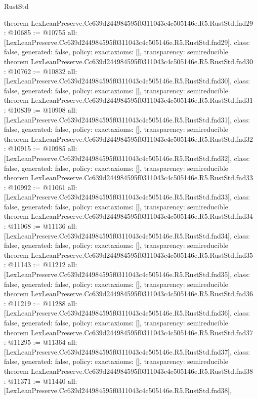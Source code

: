 \begin{lexlean}{RustStd}
\begin{coremodule}
{}
theorem LexLeanPreserve.Cc639d244984595f0311043c4c505146e.R5.RustStd.fnd29 : @10685 := @10755 {
  all: [LexLeanPreserve.Cc639d244984595f0311043c4c505146e.R5.RustStd.fnd29],
  class: false,
  generated: false,
  policy: exact{axioms: []},
  transparency: semireducible
}
theorem LexLeanPreserve.Cc639d244984595f0311043c4c505146e.R5.RustStd.fnd30 : @10762 := @10832 {
  all: [LexLeanPreserve.Cc639d244984595f0311043c4c505146e.R5.RustStd.fnd30],
  class: false,
  generated: false,
  policy: exact{axioms: []},
  transparency: semireducible
}
theorem LexLeanPreserve.Cc639d244984595f0311043c4c505146e.R5.RustStd.fnd31 : @10839 := @10908 {
  all: [LexLeanPreserve.Cc639d244984595f0311043c4c505146e.R5.RustStd.fnd31],
  class: false,
  generated: false,
  policy: exact{axioms: []},
  transparency: semireducible
}
theorem LexLeanPreserve.Cc639d244984595f0311043c4c505146e.R5.RustStd.fnd32 : @10915 := @10985 {
  all: [LexLeanPreserve.Cc639d244984595f0311043c4c505146e.R5.RustStd.fnd32],
  class: false,
  generated: false,
  policy: exact{axioms: []},
  transparency: semireducible
}
theorem LexLeanPreserve.Cc639d244984595f0311043c4c505146e.R5.RustStd.fnd33 : @10992 := @11061 {
  all: [LexLeanPreserve.Cc639d244984595f0311043c4c505146e.R5.RustStd.fnd33],
  class: false,
  generated: false,
  policy: exact{axioms: []},
  transparency: semireducible
}
theorem LexLeanPreserve.Cc639d244984595f0311043c4c505146e.R5.RustStd.fnd34 : @11068 := @11136 {
  all: [LexLeanPreserve.Cc639d244984595f0311043c4c505146e.R5.RustStd.fnd34],
  class: false,
  generated: false,
  policy: exact{axioms: []},
  transparency: semireducible
}
theorem LexLeanPreserve.Cc639d244984595f0311043c4c505146e.R5.RustStd.fnd35 : @11143 := @11212 {
  all: [LexLeanPreserve.Cc639d244984595f0311043c4c505146e.R5.RustStd.fnd35],
  class: false,
  generated: false,
  policy: exact{axioms: []},
  transparency: semireducible
}
theorem LexLeanPreserve.Cc639d244984595f0311043c4c505146e.R5.RustStd.fnd36 : @11219 := @11288 {
  all: [LexLeanPreserve.Cc639d244984595f0311043c4c505146e.R5.RustStd.fnd36],
  class: false,
  generated: false,
  policy: exact{axioms: []},
  transparency: semireducible
}
theorem LexLeanPreserve.Cc639d244984595f0311043c4c505146e.R5.RustStd.fnd37 : @11295 := @11364 {
  all: [LexLeanPreserve.Cc639d244984595f0311043c4c505146e.R5.RustStd.fnd37],
  class: false,
  generated: false,
  policy: exact{axioms: []},
  transparency: semireducible
}
theorem LexLeanPreserve.Cc639d244984595f0311043c4c505146e.R5.RustStd.fnd38 : @11371 := @11440 {
  all: [LexLeanPreserve.Cc639d244984595f0311043c4c505146e.R5.RustStd.fnd38],
}
\end{coremodule}
\end{lexlean}
